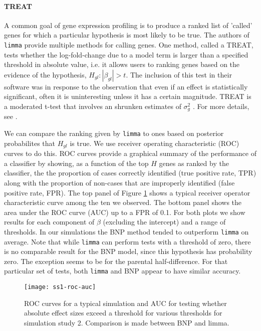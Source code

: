 \paragraph{TREAT}
A common goal of gene expression profiling is to produce a ranked list of 'called' genes for which a particular hypothesis is most likely to be true. The authors of \texttt{limma} provide multiple methods for calling genes. One method, called a TREAT, tests whether the log-fold-change due to a model term is larger than a specified threshold in absolute value, i.e. it allows users to ranking genes based on the evidence of the hypothesis, $H_{gl}:|\beta_{gl}|>t$. The inclusion of this test in their software was in response to the observation that even if an effect is statistically significant, often it is uninteresting unless it has a certain magnitude. TREAT is a moderated t-test that involves an shrunken estimates of $\sigma^2_g$ \citep{treat}. For more details, see \citet{treat}.

We can compare the ranking given by \texttt{limma} to ones based on posterior probabilites that $H_{gl}$ is true. We use receiver operating characteristic (ROC) curves to do this. ROC curves provide a graphical summary of the performance of a classifier by showing, as a function of the top $H$ genes as ranked by the classifier, the the proportion of cases correctly identified (true positive rate, TPR) along with the proportion of non-cases that are improperly identified (false positive rate, FPR). The top panel of Figure \ref{roc-ss1} shows a typical receiver operator characteristic curve among the ten we observed. The bottom panel shows the area under the ROC curve (AUC) up to a FPR of 0.1. For both plots we show results for each component of $\beta$ (excluding the intercept) and a range of thresholds. In our simulations the BNP method tended to outperform \texttt{limma} on average. Note that while \texttt{limma} can perform tests with a threshold of zero, there is no comparable result for the BNP model, since this hypothesis has probability zero. The exception seems to be for the parental half-difference. For that particular set of tests, both \texttt{limma} and BNP appear to have similar accuracy.
% 
\begin{figure}[ht!]
\centering
\texttt{[image: ss1-roc-auc]}
\caption{ROC curves for a typical simulation and AUC for testing whether absolute effect sizes exceed a threshold for various thresholds for simulation study 2. Comparison is made between BNP and limma.}
\label{roc-ss1}
\end{figure}

